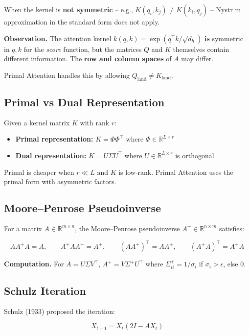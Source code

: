 When the kernel is \textbf{not symmetric} -- e.g., $K(q_i, k_j) \ne K(k_i, q_j)$ 
-- Nystr m approximation in the standard form does not apply.

\textbf{Observation.} The attention kernel $k(q, k) = \exp(q^\top k / \sqrt{d_h})$ 
\textbf{is} symmetric in $q, k$ for the \textit{score} function, but the matrices $Q$ and 
$K$ themselves contain different information. The \textbf{row and column spaces} 
of $A$ may differ.

Primal Attention handles this by allowing $Q_\text{land} \ne K_\text{land}$.

\subsection{Primal vs Dual Representation}

Given a kernel matrix $K$ with rank $r$:

\begin{itemize}
\item \textbf{Primal representation:} $K = \Phi \Phi^\top$ where $\Phi \in \mathbb{R}^{L \times r}$
\item \textbf{Dual representation:} $K = U \Sigma U^\top$ where $U \in \mathbb{R}^{L \times r}$ is orthogonal

\end{itemize}
Primal is cheaper when $r \ll L$ and $K$ is low-rank. Primal Attention uses 
the primal form with asymmetric factors.

\subsection{Moore--Penrose Pseudoinverse}

For a matrix $A \in \mathbb{R}^{m \times n}$, the Moore--Penrose pseudoinverse 
$A^+ \in \mathbb{R}^{n \times m}$ satisfies:

\[
A A^+ A = A, \qquad A^+ A A^+ = A^+, \qquad (A A^+)^\top = A A^+, \qquad (A^+ A)^\top = A^+ A
\]

\textbf{Computation.} For $A = U \Sigma V^\top$, $A^+ = V \Sigma^+ U^\top$ where 
$\Sigma^+_{ii} = 1/\sigma_i$ if $\sigma_i > \epsilon$, else $0$.

\subsection{Schulz Iteration}

Schulz (1933) proposed the iteration:

\[
X_{t+1} = X_t (2I - A X_t)
\]

